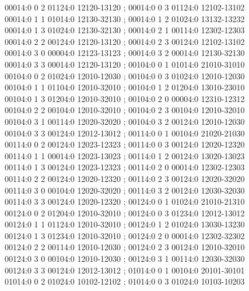 \documentclass[11pt]{article}
\theoremstyle{remark}
\numberwithin{equation}{section}
\numberwithin{table}{section}
\begin{document}
\begin{flushleft}
00014:0 0 2 01124:0 12120-13120 ; 00014:0 0 3 01124:0 12102-13102\\
00014:0 1 1 01014:0 12130-32130 ; 00014:0 1 2 01024:0 13132-13232\\
00014:0 1 3 01024:0 12130-32130 ; 00014:0 2 1 00114:0 12302-12303\\
00014:0 2 2 00124:0 12120-13120 ; 00014:0 2 3 00124:0 12102-13102\\
00014:0 3 0 00004:0 12123-13123 ; 00014:0 3 2 00014:0 12130-32130\\
00014:0 3 3 00014:0 12120-13120 ; 00104:0 0 1 01014:0 21010-31010\\
00104:0 0 2 01024:0 12010-12030 ; 00104:0 0 3 01024:0 12010-12030\\
00104:0 1 1 01104:0 12010-32010 ; 00104:0 1 2 01204:0 13010-23010\\
00104:0 1 3 01204:0 12010-32010 ; 00104:0 2 0 00004:0 12310-12312\\
00104:0 2 2 00104:0 12010-32010 ; 00104:0 2 3 00104:0 12010-32010\\
00104:0 3 1 00114:0 12020-32020 ; 00104:0 3 2 00124:0 12010-12030\\
00104:0 3 3 00124:0 12012-13012 ; 00114:0 0 1 00104:0 21020-21030\\
00114:0 0 2 00124:0 12023-12323 ; 00114:0 0 3 00124:0 12020-12320\\
00114:0 1 1 00014:0 12023-13023 ; 00114:0 1 2 00124:0 13020-13023\\
00114:0 1 3 00124:0 12023-12323 ; 00114:0 2 0 00014:0 12302-12303\\
00114:0 2 2 00124:0 12020-12320 ; 00114:0 2 3 00124:0 12020-32020\\
00114:0 3 0 00104:0 12020-32020 ; 00114:0 3 2 00124:0 12030-32030\\
00114:0 3 3 00124:0 12020-12320 ; 00124:0 0 1 01024:0 21010-21310\\
00124:0 0 2 01204:0 12010-32010 ; 00124:0 0 3 01234:0 12012-13012\\
00124:0 1 1 01124:0 12010-32010 ; 00124:0 1 2 01024:0 13030-13230\\
00124:0 1 3 01234:0 12010-32010 ; 00124:0 2 0 00014:0 12302-32302\\
00124:0 2 2 00114:0 12010-12030 ; 00124:0 2 3 00124:0 12010-32010\\
00124:0 3 0 00104:0 12010-12030 ; 00124:0 3 1 00114:0 12030-32030\\
00124:0 3 3 00124:0 12012-13012 ; 01014:0 0 1 00104:0 20101-30101\\
01014:0 0 2 01024:0 10102-12102 ; 01014:0 0 3 01024:0 10103-10203\\

\end{flushleft}
\end{document}
